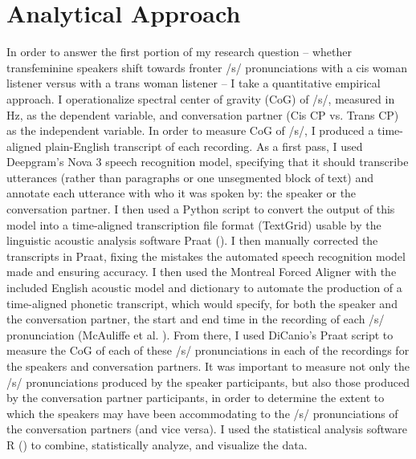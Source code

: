 \documentclass[12pt,twoside]{reedthesis}
\begin{document}
\section{Analytical Approach} \label{analytical_approach}
In order to answer the first portion of my research question -- whether transfeminine speakers shift towards fronter /s/ pronunciations with a cis woman listener versus with a trans woman listener -- I take a quantitative empirical approach. I operationalize spectral center of gravity (CoG) of /s/, measured in Hz, as the dependent variable, and conversation partner (Cis CP vs. Trans CP) as the independent variable. In order to measure CoG of /s/, I produced a time-aligned plain-English transcript of each recording. As a first pass, I used Deepgram's Nova 3 speech recognition model, specifying that it should transcribe utterances (rather than paragraphs or one unsegmented block of text) and annotate each utterance with who it was spoken by: the speaker or the conversation partner. I then used a Python script to convert the output of this model into a time-aligned transcription file format (TextGrid) usable by the linguistic acoustic analysis software Praat (\cite{boersma_praat_2023}). I then manually corrected the transcripts in Praat, fixing the mistakes the automated speech recognition model made and ensuring accuracy. I then used the Montreal Forced Aligner with the included English acoustic model and dictionary to automate the production of a time-aligned phonetic transcript, which would specify, for both the speaker and the conversation partner, the start and end time in the recording of each /s/ pronunciation (McAuliffe et al. \cite*{forced_aligner}). From there, I used DiCanio's \parencite*{dicanio_spectral_2021} Praat script to measure the CoG of each of these /s/ pronunciations in each of the recordings for the speakers and conversation partners. It was important to measure not only the /s/ pronunciations produced by the speaker participants, but also those produced by the conversation partner participants, in order to determine the extent to which the speakers may have been accommodating to the /s/ pronunciations of the conversation partners (and vice versa). I used the statistical analysis software R (\cite{r_core_team_r_2025}) to combine, statistically analyze, and visualize the data.
\end{document}
